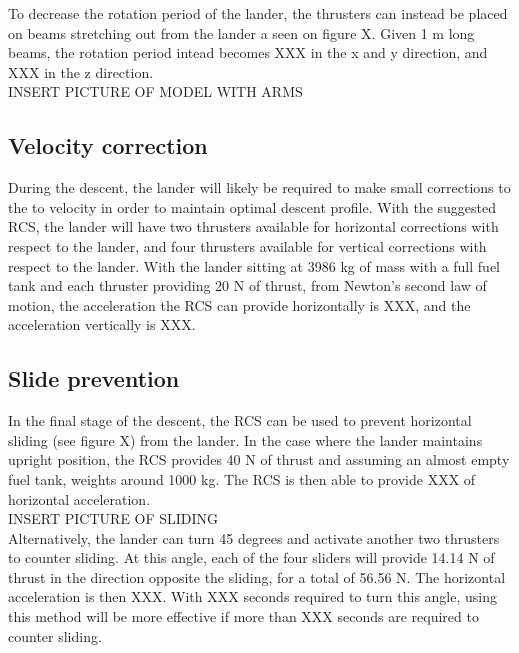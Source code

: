 To decrease the rotation period of the lander, the thrusters can instead be placed on beams stretching out from the lander a seen on figure X. Given 1 m long beams, the rotation period intead becomes XXX in the x and y direction, and XXX in the z direction.\\

					INSERT PICTURE OF MODEL WITH ARMS\\

\subsection{Velocity correction}

During the descent, the lander will likely be required to make small corrections to the to velocity in order to maintain optimal descent profile. With the suggested RCS, the lander will have two thrusters available for horizontal corrections with respect to the lander, and four thrusters available for vertical corrections with respect to the lander. With the lander sitting at 3986 kg of mass with a full fuel tank and each thruster providing 20 N of thrust, from Newton's second law of motion, the acceleration the RCS can provide horizontally is XXX, and the acceleration vertically is XXX. 


\subsection{Slide prevention}

In the final stage of the descent, the RCS can be used to prevent horizontal sliding (see figure X) from the lander. In the case where the lander maintains upright position, the RCS provides 40 N of thrust and assuming an almost empty fuel tank, weights around 1000 kg. The RCS is then able to provide XXX of horizontal acceleration.\\

					INSERT PICTURE OF SLIDING\\

Alternatively, the lander can turn 45 degrees and activate another two thrusters to counter sliding. At this angle, each of the four sliders will provide 14.14 N of thrust in the direction opposite the sliding, for a total of 56.56 N. The horizontal acceleration is then XXX. With XXX seconds required to turn this angle, using this method will be more effective if more than XXX seconds are required to counter sliding.\\

